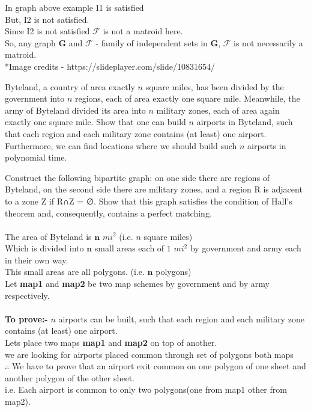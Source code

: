 \documentclass[11pt]{exam}
\begin{document}
\begin{questions}
\begin{solution}
    In graph above example I1 is satisfied\\
    But, I2 is not satisfied.\\
    Since I2 is not satisfied $\pmb{\mathcal{F}}$ is not a matroid here.\\
    So, any graph $\pmb{G}$ and $\pmb{\mathcal{F}}$ - family of independent sets in $\pmb{G}$, $\pmb{\mathcal{F}}$ is not necessarily a matroid.\\
    
    *Image credits - https://slideplayer.com/slide/10831654/
\end{solution}



\question Byteland, a country of area exactly $n$ square miles, has been divided by the government into
$n$ regions, each of area exactly one square mile. Meanwhile, the army of Byteland divided
its area into $n$ military zones, each of area again exactly one square mile. Show that one can
build   $n$ airports in Byteland, such that each region and each military zone contains (at least)
one airport. Furthermore, we can find locations where we should build such $n$ airports in
polynomial time.

\begin{solution}
    Construct the following bipartite graph: on one side there are regions of Byteland, on
the second side there are military zones, and a region R is adjacent to a zone Z if R∩Z = ∅.
Show that this graph satisfies the condition of Hall’s theorem and, consequently, contains
a perfect matching.\\\\
    
    The area of Byteland is $\pmb{n}$ $mi^2$ (i.e. $n$ square miles)\\
    Which is divided into $\pmb{n}$ small areas each of $1$ $mi^2$ by government and army each in their own way.\\
    This small areas are all polygons. (i.e. $\pmb{n}$ polygons)\\
    Let \textbf{map1} and \textbf{map2} be two map schemes by government and by army respectively.\\\\

    \textbf{To prove:-} $n$ airports can be built, such that each region and each military zone contains (at least) one airport.\\
    Lets place two maps \textbf{map1} and \textbf{map2} on top of another.\\
    we are looking for airports placed common through set of polygons both maps\\
    $\therefore$ We have to prove that an airport exit common on one polygon of one sheet and another polygon of the other sheet.\\
    i.e. Each airport is common to only two polygons(one from map1 other from map2).\\
    

\end{solution}
\end{questions}
\end{document}
